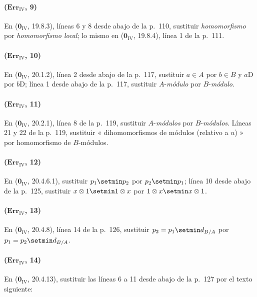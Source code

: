 \paragraph{($\mathbf{Err}_{\mathrm{IV}}$, 9)}
En ($\mathbf{0}_{\mathrm{IV}}$, 19.8.3), líneas 6 y 8 desde abajo de la p.~110,
sustituir \emph{homomorfismo} por \emph{homomorfismo local}; lo mismo en
($\mathbf{0}_{\mathrm{IV}}$, 19.8.4), línea 1 de la p.~111.

\paragraph{($\mathbf{Err}_{\mathrm{IV}}$, 10)}
En ($\mathbf{0}_{\mathrm{IV}}$, 20.1.2), línea 2 desde abajo de la p.~117,
sustituir $a\in A$ por $b\in B$ y $a\mathrm{D}$ por $b\mathrm{D}$; línea 1 desde abajo de la
p.~117, sustituir $A$-\emph{módulo} por $B$-\emph{módulo}.

\paragraph{($\mathbf{Err}_{\mathrm{IV}}$, 11)}
En ($\mathbf{0}_{\mathrm{IV}}$, 20.2.1), línea 8 de la p.~119, sustituir
$A$-\emph{módulos} por $B$-\emph{módulos}. Líneas 21 y 22 de la p.~119, sustituir
« dihomomorfismos de módulos (relativo a $u$) » por homomorfismo
de $B$-módulos.

\paragraph{($\mathbf{Err}_{\mathrm{IV}}$, 12)}
En ($\mathbf{0}_{\mathrm{IV}}$, 20.4.6.1), sustituir $p_1\setmin p_2$ por $p_2\setmin p_1$;
línea 10 desde abajo de la p.~125, sustituir $x\otimes1\setmin 1\otimes x$ por
$1\otimes x\setmin x\otimes1$.

\paragraph{($\mathbf{Err}_{\mathrm{IV}}$, 13)}
En ($\mathbf{0}_{\mathrm{IV}}$, 20.4.8), línea 14 de la p.~126, sustituir
$p_2=p_1\setmin d_{B/A}$ por $p_1=p_2\setmin d_{B/A}$.

\paragraph{($\mathbf{Err}_{\mathrm{IV}}$, 14)}
En ($\mathbf{0}_{\mathrm{IV}}$, 20.4.13), sustituir las líneas 6 a 11 desde abajo
de la p.~127 por el texto siguiente:

